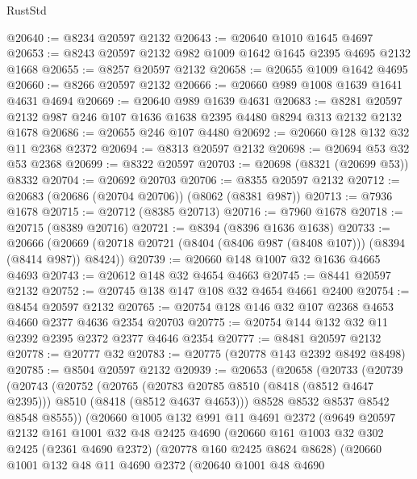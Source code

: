 \begin{lexlean}{RustStd}
\begin{coremodule}
@20640 := @8234 @20597 @2132
@20643 := @20640 @1010 @1645 @4697
@20653 := @8243 @20597 @2132 @982 @1009 @1642 @1645 @2395 @4695 @2132 @1668
@20655 := @8257 @20597 @2132
@20658 := @20655 @1009 @1642 @4695
@20660 := @8266 @20597 @2132
@20666 := @20660 @989 @1008 @1639 @1641 @4631 @4694
@20669 := @20640 @989 @1639 @4631
@20683 := @8281 @20597 @2132 @987 @246 @107 @1636 @1638 @2395 @4480 @8294 @313 @2132 @2132 @1678
@20686 := @20655 @246 @107 @4480
@20692 := @20660 @128 @132 @32 @11 @2368 @2372
@20694 := @8313 @20597 @2132
@20698 := @20694 @53 @32 @53 @2368
@20699 := @8322 @20597
@20703 := @20698 (@8321 (@20699 @53)) @8332
@20704 := @20692 @20703
@20706 := @8355 @20597 @2132
@20712 := @20683 (@20686 (@20704 @20706)) (@8062 (@8381 @987))
@20713 := @7936 @1678
@20715 := @20712 (@8385 @20713)
@20716 := @7960 @1678
@20718 := @20715 (@8389 @20716)
@20721 := @8394 (@8396 @1636 @1638)
@20733 := @20666
    (@20669 (@20718 @20721 (@8404 (@8406 @987 (@8408 @107))) (@8394 (@8414 @987)) @8424))
@20739 := @20660 @148 @1007 @32 @1636 @4665 @4693
@20743 := @20612 @148 @32 @4654 @4663
@20745 := @8441 @20597 @2132
@20752 := @20745 @138 @147 @108 @32 @4654 @4661 @2400
@20754 := @8454 @20597 @2132
@20765 := @20754 @128 @146 @32 @107 @2368 @4653 @4660 @2377 @4636 @2354 @20703
@20775 := @20754 @144 @132 @32 @11 @2392 @2395 @2372 @2377 @4646 @2354
@20777 := @8481 @20597 @2132
@20778 := @20777 @32
@20783 := @20775 (@20778 @143 @2392 @8492 @8498)
@20785 := @8504 @20597 @2132
@20939 := @20653
    (@20658
      (@20733
        (@20739
          (@20743
            (@20752
              (@20765
                (@20783 @20785 @8510 (@8418 (@8512 @4647 @2395)))
                @8510
                (@8418 (@8512 @4637 @4653)))
              @8528
              @8532
              @8537
              @8542
              @8548
              @8555))
          (@20660
            @1005
            @132
            @991
            @11
            @4691
            @2372
            (@9649
              @20597
              @2132
              @161
              @1001
              @32
              @48
              @2425
              @4690
              (@20660
                @161
                @1003
                @32
                @302
                @2425
                (@2361 @4690 @2372)
                (@20778 @160 @2425 @8624 @8628)
                (@20660
                  @1001
                  @132
                  @48
                  @11
                  @4690
                  @2372
                  (@20640
                    @1001
                    @48
                    @4690

\end{coremodule}
\end{lexlean}

